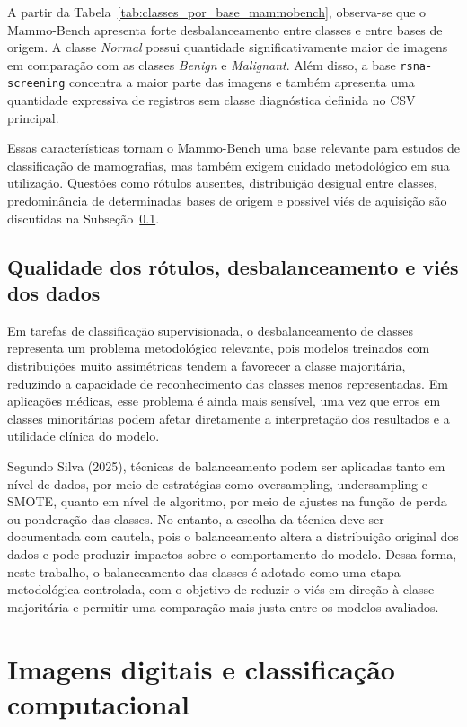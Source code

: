 \documentclass[
    12pt,
    openright,
    oneside,
    a4paper,
    english,
    brazil
]{abntex2}
\begin{document}
A partir da Tabela~\ref{tab:classes_por_base_mammobench}, observa-se que o Mammo-Bench apresenta forte desbalanceamento entre classes e entre bases de origem. A classe \textit{Normal} possui quantidade significativamente maior de imagens em comparação com as classes \textit{Benign} e \textit{Malignant}. Além disso, a base \texttt{rsna-screening} concentra a maior parte das imagens e também apresenta uma quantidade expressiva de registros sem classe diagnóstica definida no CSV principal.

Essas características tornam o Mammo-Bench uma base relevante para estudos de classificação de mamografias, mas também exigem cuidado metodológico em sua utilização. Questões como rótulos ausentes, distribuição desigual entre classes, predominância de determinadas bases de origem e possível viés de aquisição são discutidas na Subseção~\ref{subsec:qualidade_rotulos_balanceamento_vies}.



\subsection{Qualidade dos rótulos, desbalanceamento e viés dos dados}
\label{subsec:qualidade_rotulos_balanceamento_vies}

Em tarefas de classificação supervisionada, o desbalanceamento de classes representa um problema metodológico relevante, pois modelos treinados com distribuições muito assimétricas tendem a favorecer a classe majoritária, reduzindo a capacidade de reconhecimento das classes menos representadas. Em aplicações médicas, esse problema é ainda mais sensível, uma vez que erros em classes minoritárias podem afetar diretamente a interpretação dos resultados e a utilidade clínica do modelo.

Segundo Silva (2025), técnicas de balanceamento podem ser aplicadas tanto em nível de dados, por meio de estratégias como oversampling, undersampling e SMOTE, quanto em nível de algoritmo, por meio de ajustes na função de perda ou ponderação das classes. No entanto, a escolha da técnica deve ser documentada com cautela, pois o balanceamento altera a distribuição original dos dados e pode produzir impactos sobre o comportamento do modelo. Dessa forma, neste trabalho, o balanceamento das classes é adotado como uma etapa metodológica controlada, com o objetivo de reduzir o viés em direção à classe majoritária e permitir uma comparação mais justa entre os modelos avaliados.

\section{Imagens digitais e classificação computacional}
\end{document}
